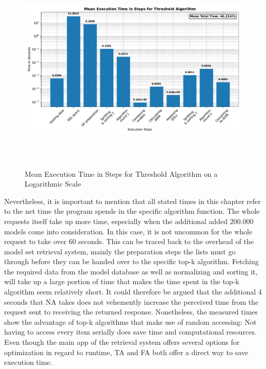   \begin{figure}[htbp]
    \centering
    \includegraphics[height=10cm]{plots/executiontime_threshold.pdf}
    \caption{Mean Execution Time in Steps for Threshold Algorithm on a Logarithmic Scale}
    \label{fig:timethreshold}
  \end{figure}


Nevertheless, it is important to mention that all stated times in this chapter refer to the net time the program spends in the specific algorithm function. The whole requests itself take up more time, especially when the additional added 200.000 models come into consideration. In this case, it is not uncommon for the whole request to take over 60 seconds. This can be traced back to the overhead of the model set retrieval system, mainly the preparation steps the lists must go through before they can be handed over to the specific top-k algorithm. Fetching the required data from the model database as well as normalizing and sorting it, will take up a large portion of time that makes the time spent in the top-k algorithm seem relatively short. It could therefore be argued that the additional 4 seconds that NA takes does not vehemently increase the perceived time from the request sent to receiving the returned response. Nonetheless, the measured times show the advantage of top-k algorithms that make use of random accessing: Not having to access every item serially does save time and computational resources. Even though the main app of the retrieval system offers several options for optimization in regard to runtime, TA and FA both offer a direct way to save execution time. 

